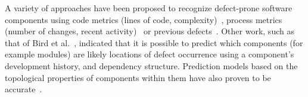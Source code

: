 \documentclass[sigconf,review, anonymous]{acmart}
\theoremstyle{break}
\theoremstyle{break}
\begin{document}
A variety of approaches have been proposed to recognize
 defect-prone  software components using code metrics (lines of code, complexity)~\cite{d2010extensive,menzies2007data, nagappan2006mining,shepperd2014researcher,Menzies2010}, process metrics (number of changes, recent activity)~\cite{hassan2009predicting} or previous defects~\cite{kim2007predicting}.
Other work, such as that of 
Bird et al.~\cite{bird2009putting}, indicated that it is possible to predict which components (for example modules) are likely locations of
defect occurrence using a component's development history,
and dependency structure. 
Prediction models based on the topological properties
of components within them have also  proven to be  
accurate~\cite{zimmermann2008predicting}.
\end{document}
